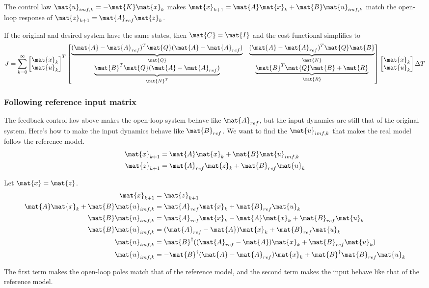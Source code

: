 The control law $\mat{u}_{imf,k} = -\mat{K}\mat{x}_k$ makes
$\mat{x}_{k+1} = \mat{A}\mat{x}_k + \mat{B}\mat{u}_{imf,k}$ match the open-loop
response of $\mat{z}_{k+1} = \mat{A}_{ref}\mat{z}_k$.

If the original and desired system have the same states, then
$\mat{C} = \mat{I}$ and the cost functional simplifies to
\begin{equation}
  J = \sum_{k=0}^\infty
  \begin{bmatrix}
    \mat{x}_k \\
    \mat{u}_k
  \end{bmatrix}^T
  \begin{bmatrix}
    \underbrace{(\mat{A} - \mat{A}_{ref})^T\mat{Q}
      (\mat{A} - \mat{A}_{ref})}_{\mat{Q}} &
    \underbrace{(\mat{A} - \mat{A}_{ref})^T\mat{Q}\mat{B}}_{\mat{N}} \\
    \underbrace{\mat{B}^T\mat{Q}(\mat{A} - \mat{A}_{ref})}_{\mat{N}^T} &
    \underbrace{\mat{B}^T\mat{Q}\mat{B} + \mat{R}}_{\mat{R}}
  \end{bmatrix}
  \begin{bmatrix}
    \mat{x}_k \\
    \mat{u}_k
  \end{bmatrix}
  \Delta T
\end{equation}

\subsubsection{Following reference input matrix}

The feedback control law above makes the open-loop system behave like
$\mat{A}_{ref}$, but the input dynamics are still that of the original system.
Here's how to make the input dynamics behave like $\mat{B}_{ref}$. We want to
find the $\mat{u}_{imf,k}$ that makes the real model follow the reference model.
\begin{align*}
  \mat{x}_{k+1} &= \mat{A}\mat{x}_k + \mat{B}\mat{u}_{imf,k} \\
  \mat{z}_{k+1} &= \mat{A}_{ref}\mat{z}_k + \mat{B}_{ref}\mat{u}_k
\end{align*}

Let $\mat{x} = \mat{z}$.
\begin{align*}
  \mat{x}_{k+1} &= \mat{z}_{k+1} \\
  \mat{A}\mat{x}_k + \mat{B}\mat{u}_{imf,k} &= \mat{A}_{ref}\mat{x}_k +
    \mat{B}_{ref}\mat{u}_k \\
  \mat{B}\mat{u}_{imf,k} &= \mat{A}_{ref}\mat{x}_k - \mat{A}\mat{x}_k +
    \mat{B}_{ref}\mat{u}_k \\
  \mat{B}\mat{u}_{imf,k} &= (\mat{A}_{ref} - \mat{A})\mat{x}_k +
    \mat{B}_{ref}\mat{u}_k \\
  \mat{u}_{imf,k} &= \mat{B}^\dagger ((\mat{A}_{ref} - \mat{A})\mat{x}_k +
    \mat{B}_{ref}\mat{u}_k) \\
  \mat{u}_{imf,k} &= -\mat{B}^\dagger (\mat{A} - \mat{A}_{ref})\mat{x}_k +
    \mat{B}^\dagger \mat{B}_{ref}\mat{u}_k
\end{align*}

The first term makes the open-loop poles match that of the reference model, and
the second term makes the input behave like that of the reference model.
